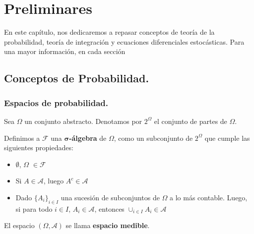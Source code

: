 
\chapter{Preliminares}


En este capítulo, nos dedicaremos a repasar conceptos de teoría de la probabilidad, teoría de integración y ecuaciones diferenciales estocásticas. Para una mayor información, en cada sección








\section{Conceptos de Probabilidad.}

\subsection{Espacios de probabilidad.}

Sea $\Omega$ un conjunto abstracto. Denotamos por $2^{\Omega}$ el conjunto de partes de $\Omega$.

\begin{boxDef}
Definimos a $\mathcal{F}$ una $\mathbf{\sigma}$\textbf{-álgebra} de $\Omega$, como un subconjunto de $2^{\Omega}$ que cumple las siguientes propiedades:

	\begin{itemize}
		\item $\emptyset$, $\Omega$ $\in \mathcal{F}$
		\item Si $A \in \mathcal{A}$, luego $A^{c} \in \mathcal{A}$
		\item Dado $\{ A_i \}_{i \in I}$ una sucesión de subconjuntos de $\Omega$ a lo más contable. Luego, si para todo $i \in I$, $A_i \in \mathcal{A}$, entonces $\cup_{i \in I} A_i \in \mathcal{A}$ 
	\end{itemize}

El espacio $\left( \Omega, \mathcal{A} \right)$ se llama \textbf{espacio medible}.

\end{boxDef}



